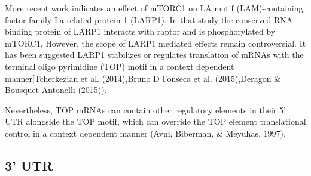 \documentclass[12pt,openany]{book}
\begin{document}
More recent work indicates an effect of mTORC1 on LA motif
(LAM)-containing factor family La-related protein 1 (LARP1). In that
study the conserved RNA-binding protein of LARP1 interacts with raptor
and is phosphorylated by mTORC1. However, the scope of LARP1 mediated
effects remain controversial. It has been suggested LARP1 stabilizes or
regulates translation of mRNAs with the terminal oligo pyrimidine (TOP)
motif in a context dependent manner{[}Tcherkezian et al. (2014),Bruno D
Fonseca et al. (2015),Deragon \& Bousquet-Antonelli (2015)).

Nevertheless, TOP mRNAs can contain other regulatory elements in their
5' UTR alongside the TOP motif, which can override the TOP element
translational control in a context dependent manner (Avni, Biberman, \&
Meyuhas, 1997).

\subsection{3' UTR}
\end{document}
